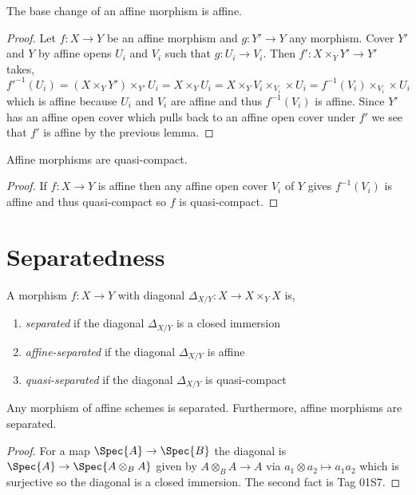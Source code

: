 \documentclass[12pt]{article}
\begin{document}
\begin{lemma}
The base change of an affine morphism is affine. 
\end{lemma}

\begin{proof}
Let $f : X \to Y$ be an affine morphism and $g : Y' \to Y$ any morphism. Cover $Y'$ and $Y$ by affine opens $U_i$ and $V_i$ such that $g : U_i \to V_i$. Then $f' : X \times_Y Y' \to Y'$ takes,
\[ f'^{-1}(U_i) = (X \times_Y Y') \times_{Y'} U_i = X \times_Y U_i = X \times_Y V_i \times_{V_i} \times U_i = f^{-1}(V_i) \times_{V_i} \times U_i \]
which is affine because $U_i$ and $V_i$ are affine and thus $f^{-1}(V_i)$ is affine. Since $Y'$ has an affine open cover which pulls back   to an affine open cover under $f'$ we see that $f'$ is affine by the previous lemma.
\end{proof}


\begin{lemma}
Affine morphisms are quasi-compact.
\end{lemma}

\begin{proof}
If $f : X \to Y$ is affine then any affine open cover $V_i$ of $Y$ gives $f^{-1}(V_i)$ is affine and thus quasi-compact so $f$ is quasi-compact. 
\end{proof}



\section{Separatedness}

\begin{defn}
A morphism $f : X \to Y$ with diagonal $\Delta_{X/Y} : X \to X \times_Y X$ is,
\begin{enumerate}
\item \textit{separated} if the diagonal $\Delta_{X/Y}$ is a closed immersion
\item \textit{affine-separated} if the diagonal $\Delta_{X/Y}$ is affine
\item \textit{quasi-separated} if the diagonal $\Delta_{X/Y}$ is quasi-compact
\end{enumerate}
\end{defn}

\begin{lemma}
Any morphism of affine schemes is separated. Furthermore, affine morphisms are separated.
\end{lemma}

\begin{proof}
For a map $\Spec{A} \to \Spec{B}$ the diagonal is $\Spec{A} \to \Spec{A \otimes_B A}$ given by $A \otimes_B A \to A$ via $a_1 \otimes a_2 \mapsto a_1 a_2$ which is surjective so the diagonal is a closed immersion. The second fact is Tag 01S7.
\end{proof}
\end{document}
